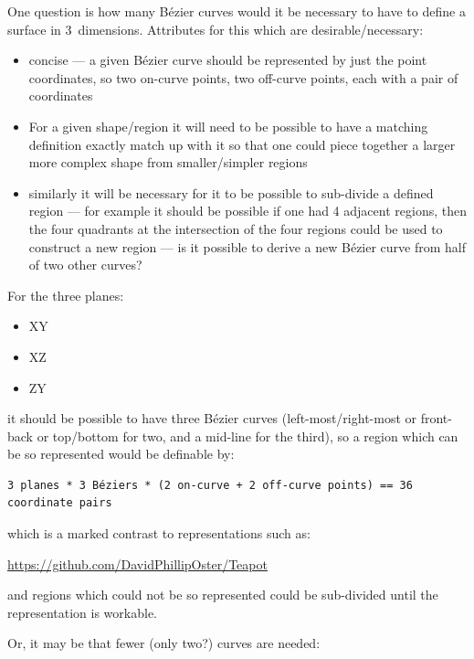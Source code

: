 \documentclass{ltxdoc}
\begin{document}
One question is how many Bézier curves would it be necessary to have to define a surface in 3~dimensions. Attributes for this which are desirable/necessary:

\begin{itemize}
\item concise --- a given Bézier curve should be represented by just the point coordinates, 
      so two on-curve points, two off-curve points, each with a pair of coordinates
\item For a given shape/region it will need to be possible to have a matching definition 
      exactly match up with it so that one could piece together a larger more complex shape 
      from smaller/simpler regions
\item similarly it will be necessary for it to be possible to sub-divide a defined region --- 
      for example it should be possible if one had 4 adjacent regions, then the four quadrants 
      at the intersection of the four regions could be used to construct a new region --- is it
      possible to derive a new Bézier curve from half of two other curves?
\end{itemize}

\begin{samepage}
For the three planes:

\begin{itemize}
 \item XY
 \item XZ
 \item ZY
\end{itemize}
 
\noindent it should be possible to have three Bézier curves (left-most/right-most or front-back or top/bottom for two, and a mid-line for the third), so a region which can be so represented would be definable by:
 
\begin{verbatim}
3 planes * 3 Béziers * (2 on-curve + 2 off-curve points) == 36 coordinate pairs
\end{verbatim}
\end{samepage}
 
\noindent which is a marked contrast to representations such as:
 
\url{https://github.com/DavidPhillipOster/Teapot}

\noindent and regions which could not be so represented could be sub-divided until the representation is workable.

Or, it may be that fewer (only two?) curves are needed:
\end{document}
